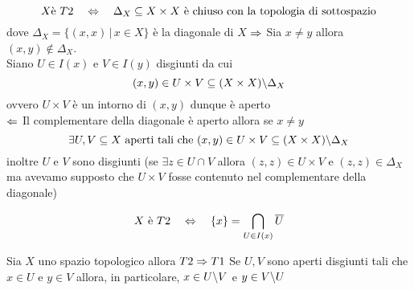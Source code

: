 \begin{prop}\bianco
$$ X\text{\`e } T2 \quad \Leftrightarrow \quad \Delta_X\subseteq X \times X \text{ \`e chiuso con la topologia di sottospazio}$$
dove $\Delta_X=\{ (x,x) \, \vert \, x \in  X \}$ \`e la diagonale di $X$
\proof $\Rightarrow$ Sia $x\neq y $ allora $(x,y) \not \in \Delta_X$.\\
Siano $U \in I(x)$ e $V \in I(y)$ disgiunti da cui 
$$(x,y) \in U \times V \subseteq (X \times X ) \backslash \Delta_X$$
ovvero $U\times V$ \`e un intorno di $(x,y)$ dunque \`e aperto\\
$\Leftarrow$ Il complementare della diagonale \`e aperto allora se $x\neq y$
$$ \exists U, V \subseteq X \text{ aperti tali che  }  (x,y)\in U \times V \subseteq (X\times X) \backslash \Delta_X $$ 
inoltre $U$ e $V$ sono disgiunti (se $\exists z\in U \cap V $ allora $(z,z)\in U \times V$ e $(z,z)\in \Delta_X$ ma avevamo supposto che $U\times V$ fosse contenuto nel complementare della diagonale)

\end{prop}
\spazio
\begin{ex}
 $$ X \text{ \`e } T2 \quad \Leftrightarrow \quad \{ x\} =\bigcap_{U\in I(x)} \overline{U}$$
\end{ex}

\begin{prop} Sia $X$ uno spazio topologico allora 
$T2 \Rightarrow T1$
\proof 
Se $U,V$ sono aperti disgiunti tali che $x\in U $ e $y\in V$ allora, in particolare, $x\in U\backslash V $ e $y \in V\backslash U$

\end{prop}

